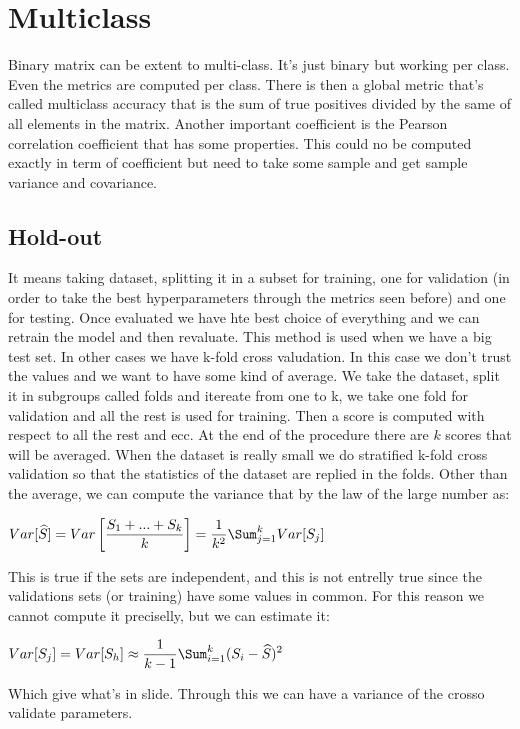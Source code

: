 \section{Multiclass}
Binary matrix can be extent to multi-class. It's just binary but working per class.\newline
Even the metrics are computed per class. There is then a global metric that's called multiclass accuracy that is the sum of true positives divided by the same of all elements in the matrix.\newline
Another important coefficient is the Pearson correlation coefficient that has some properties. This could no be computed exactly in term of coefficient but need to take some sample and get sample variance and covariance.
\subsection{Hold-out}
It means taking dataset, splitting it in a subset for training, one for validation (in order to take the best hyperparameters through the metrics seen before) and one for testing. Once evaluated we have hte best choice of everything and we can retrain the model and then revaluate. \newline
This method is used when we have a big test set. In other cases we have k-fold cross valudation. In this case we don't trust the values and we want to have some kind of average. We take the dataset, split it in subgroups called folds and itereate from one to k, we take one fold for validation and all the rest is used for training. Then a score is computed with respect to all the rest and ecc. At the end of the procedure there are $k$ scores that will be averaged. When the dataset is really small we do stratified k-fold cross validation so that the statistics of the dataset are replied in the folds.\newline
Other than the average, we can compute the variance that by the law of the large number as:
\begin{center}
	$\displaystyle Var[\widehat{S}]=Var\left[\frac{S_1+...+S_k}{k}\right]=\frac{1}{k^2}\Sum_{j=1}^kVar[S_j]$
\end{center}
This is true if the sets are independent, and this is not entrelly true since the validations sets (or training) have some values in common. For this reason we cannot compute it preciselly, but we can estimate it:
\begin{center}
	$\displaystyle Var[S_j]=Var[S_h]\approx\frac{1}{k-1}\Sum_{i=1}^k(S_i-\widehat{S})^2$
\end{center}
Which give what's in slide. \newline
Through this we can have a variance of the crosso validate parameters.
